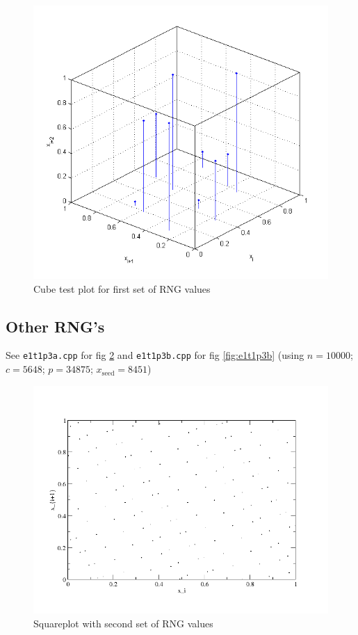 \begin{figure}
  \centering
  \includegraphics[width=\textwidth]{../pic/e1t1p2.png}
  \caption{Cube test plot for first set of RNG values}
  \label{fig:cube}
\end{figure}


\subsection{Other RNG's}
See \verb|e1t1p3a.cpp| for fig \ref{fig:e1t1p3a} and \verb|e1t1p3b.cpp| for fig \ref{fig:e1t1p3b} (using $n = 10000$; $c = 5648$; $p = 34875$; $x_\mathrm{seed} = 8451$)

\begin{figure}[b]
  \centering
  \includegraphics[width=\textwidth]{../pic/e1t1p3a.png}
  \caption{Squareplot  with second set of RNG values}
  \label{fig:e1t1p3a}
\end{figure}


